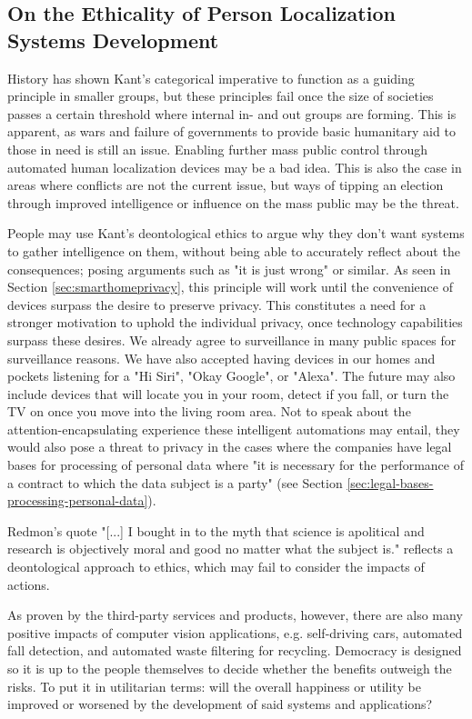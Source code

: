 \subsection{On the Ethicality of Person Localization Systems Development}
\label{sec:discussion_ethics_localization_tech}
History has shown Kant's categorical imperative to function as a guiding principle in smaller groups, but these principles fail once the size of societies passes a certain threshold where internal in- and out groups are forming. This is apparent, as wars and failure of governments to provide basic humanitary aid to those in need is still an issue. Enabling further mass public control through automated human localization devices may be a bad idea. This is also the case in areas where conflicts are not the current issue, but ways of tipping an election through improved intelligence or influence on the mass public may be the threat. 

People may use Kant's deontological ethics to argue why they don't want systems to gather intelligence on them, without being able to accurately reflect about the consequences; posing arguments such as "it is just wrong" or similar. As seen in Section \ref{sec:smarthomeprivacy}, this principle will work until the convenience of devices surpass the desire to preserve privacy. This constitutes a need for a stronger motivation to uphold the individual privacy, once technology capabilities surpass these desires. We already agree to surveillance in many public spaces for surveillance reasons. We have also accepted having devices in our homes and pockets listening for a "Hi Siri", "Okay Google", or "Alexa". The future may also include devices that will locate you in your room, detect if you fall, or turn the TV on once you move into the living room area. Not to speak about the attention-encapsulating experience these intelligent automations may entail, they would also pose a threat to privacy in the cases where the companies have legal bases for processing of personal data where "it is necessary for the performance of a contract to which the data subject is a party" (see Section \ref{sec:legal-bases-processing-personal-data}).

Redmon's quote "[...] I bought in to the myth that science is apolitical and research is objectively moral and good no matter what the subject is." reflects a deontological approach to ethics, which may fail to consider the impacts of actions. 

As proven by the third-party services and products, however, there are also many positive impacts of computer vision applications, e.g. self-driving cars, automated fall detection, and automated waste filtering for recycling. Democracy is designed so it is up to the people themselves to decide whether the benefits outweigh the risks. To put it in utilitarian terms: will the overall happiness or utility be improved or worsened by the development of said systems and applications?

